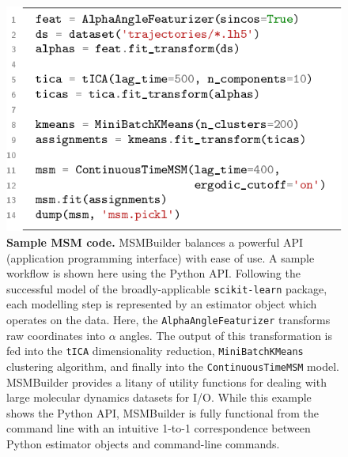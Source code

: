 \begin{figure}[htbp]
\centering
\includegraphics[width=\linewidth]{1-src/code}
\caption{\textbf{Sample MSM code.}
    MSMBuilder balances a powerful API (application programming interface) with ease of use.
    A sample workflow
    is shown here using the Python API. Following the successful model of
    the broadly-applicable \texttt{scikit-learn} package, each modelling step is
    represented by an estimator object which operates on the data. Here, the
    \texttt{AlphaAngleFeaturizer} transforms raw coordinates into
    $\alpha$ angles. The output of this transformation is fed into the
    \texttt{tICA} dimensionality reduction, \texttt{MiniBatchKMeans}
    clustering algorithm, and finally into the \texttt{ContinuousTimeMSM}
    model. MSMBuilder provides a litany of utility functions for dealing
    with large molecular dynamics datasets for I/O. While this example
    shows the Python API, MSMBuilder is fully functional from the command
    line with an intuitive 1-to-1 correspondence between Python estimator
    objects and command-line commands.
}
\label{fig:src-code}
\end{figure}

